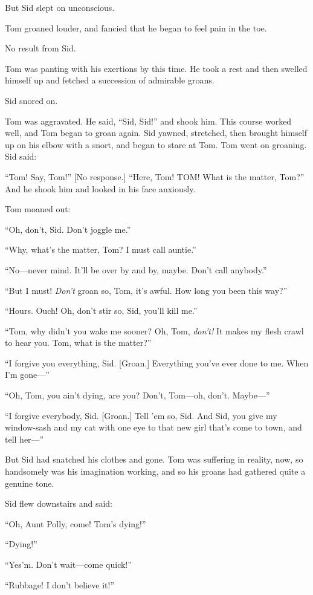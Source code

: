 \documentclass{book}
\begin{document}
But Sid slept on unconscious.

Tom groaned louder, and fancied that he began to feel pain in the toe.

No result from Sid.

Tom was panting with his exertions by this time. He took a rest and then swelled himself up and fetched a succession of admirable groans.

Sid snored on.

Tom was aggravated. He said, “Sid, Sid!” and shook him. This course worked well, and Tom began to groan again. Sid yawned, stretched, then brought himself up on his elbow with a snort, and began to stare at Tom. Tom went on groaning. Sid said:

“Tom! Say, Tom!” [No response.] “Here, Tom! TOM! What is the matter, Tom?” And he shook him and looked in his face anxiously.

Tom moaned out:

“Oh, don’t, Sid. Don’t joggle me.”

“Why, what’s the matter, Tom? I must call auntie.”

“No—never mind. It’ll be over by and by, maybe. Don’t call anybody.”

“But I must! \emph{Don’t} groan so, Tom, it’s awful. How long you been this way?”

“Hours. Ouch! Oh, don’t stir so, Sid, you’ll kill me.”

“Tom, why didn’t you wake me sooner? Oh, Tom, \emph{don’t!} It makes my flesh crawl to hear you. Tom, what is the matter?”

“I forgive you everything, Sid. [Groan.] Everything you’ve ever done to me. When I’m gone—”

“Oh, Tom, you ain’t dying, are you? Don’t, Tom—oh, don’t. Maybe—”

“I forgive everybody, Sid. [Groan.] Tell ’em so, Sid. And Sid, you give my window-sash and my cat with one eye to that new girl that’s come to town, and tell her—”

But Sid had snatched his clothes and gone. Tom was suffering in reality, now, so handsomely was his imagination working, and so his groans had gathered quite a genuine tone.

Sid flew downstairs and said:

“Oh, Aunt Polly, come! Tom’s dying!”

“Dying!”

“Yes’m. Don’t wait—come quick!”

“Rubbage! I don’t believe it!”
\end{document}
